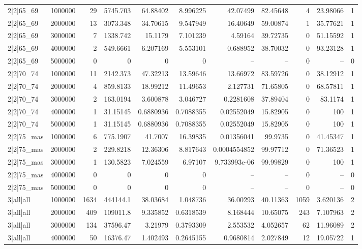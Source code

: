 \begin{tabular}{lrrrrrrrrrr}
2|2|65\_69 & 1000000 & 29 & 5745.703 & 64.88402 & 8.996225 & 42.07499 & 82.45648 & 4 & 23.98066 & 1 \\
2|2|65\_69 & 2000000 & 13 & 3073.348 & 34.70615 & 9.547949 & 16.40649 & 59.00874 & 1 & 35.77621 & 1 \\
2|2|65\_69 & 3000000 & 7 & 1338.742 & 15.1179 & 7.101239 & 4.59164 & 39.72735 & 0 & 51.15592 & 1 \\
2|2|65\_69 & 4000000 & 2 & 549.6661 & 6.207169 & 5.553101 & 0.688952 & 38.70032 & 0 & 93.23128 & 1 \\
2|2|65\_69 & 5000000 & 0 & 0 & 0 & 0 & -- & -- & 0 & -- & 0 \\
2|2|70\_74 & 1000000 & 11 & 2142.373 & 47.32213 & 13.59646 & 13.66972 & 83.59726 & 0 & 38.12912 & 1 \\
2|2|70\_74 & 2000000 & 4 & 859.8133 & 18.99212 & 11.49653 & 2.127731 & 71.65805 & 0 & 68.57811 & 1 \\
2|2|70\_74 & 3000000 & 2 & 163.0194 & 3.600878 & 3.046727 & 0.2281608 & 37.89404 & 0 & 83.1174 & 1 \\
2|2|70\_74 & 4000000 & 1 & 31.15145 & 0.6880936 & 0.7088355 & 0.02552049 & 15.82905 & 0 & 100 & 1 \\
2|2|70\_74 & 5000000 & 1 & 31.15145 & 0.6880936 & 0.7088355 & 0.02552049 & 15.82905 & 0 & 100 & 1 \\
2|2|75\_mas & 1000000 & 6 & 775.1907 & 41.7007 & 16.39835 & 0.01356041 & 99.9735 & 0 & 41.45347 & 1 \\
2|2|75\_mas & 2000000 & 2 & 229.8218 & 12.36306 & 8.817643 & 0.0004554852 & 99.97712 & 0 & 71.36523 & 1 \\
2|2|75\_mas & 3000000 & 1 & 130.5823 & 7.024559 & 6.97107 & 9.733993e-06 & 99.99829 & 0 & 100 & 1 \\
2|2|75\_mas & 4000000 & 0 & 0 & 0 & 0 & -- & -- & 0 & -- & 0 \\
2|2|75\_mas & 5000000 & 0 & 0 & 0 & 0 & -- & -- & 0 & -- & 0 \\
3|all|all & 1000000 & 1634 & 444144.1 & 38.03684 & 1.048736 & 36.00293 & 40.11363 & 1059 & 3.620136 & 2 \\
3|all|all & 2000000 & 409 & 109011.8 & 9.335852 & 0.6318539 & 8.168444 & 10.65075 & 243 & 7.107963 & 2 \\
3|all|all & 3000000 & 134 & 37596.47 & 3.21979 & 0.3793309 & 2.553532 & 4.052657 & 62 & 11.96089 & 2 \\
3|all|all & 4000000 & 50 & 16376.47 & 1.402493 & 0.2645155 & 0.9680814 & 2.027849 & 12 & 19.05722 & 1 \\

\end{tabular}
